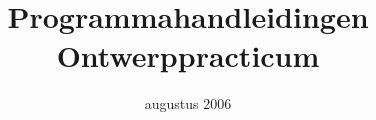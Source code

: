 \documentclass[11pt,twoside,a4paper,fancyheadings]{article}
\newcommand{\hfdaanduiding}{Hoofdstuk~}
\begin{document}
\title{Programmahandleidingen Ontwerppracticum}
\date{augustus 2006}
\author{\centerline{}}
\maketitle
\thispagestyle{empty}
\clearpage
\tableofcontents
\cleardoublepage
\pagestyle{fancy}
\appendix
\renewcommand{\hfdaanduiding}{Appendix~}








\end{document}
